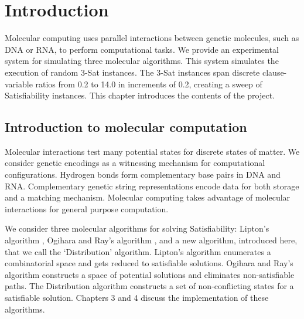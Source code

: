 \chapter{Introduction}


Molecular computing uses parallel interactions between genetic molecules, such as DNA or RNA, to perform computational tasks.  We provide an experimental system for simulating three molecular algorithms.  This system simulates the execution of random $3$-{\sc Sat} instances.  The $3$-{\sc Sat} instances span discrete clause-variable ratios from 0.2 to 14.0 in increments of 0.2, creating a sweep of {\sc Satisfiability} instances.  This chapter introduces the contents of the project.

\section{Introduction to molecular computation}
	
				
Molecular interactions test many potential states for discrete states of matter.  We consider genetic encodings as a witnessing mechanism for computational configurations.  Hydrogen bonds form complementary base pairs in DNA and RNA.  Complementary genetic string representations encode data for both storage and a matching mechanism.  Molecular computing takes advantage of molecular interactions for general purpose computation.

	We consider three molecular algorithms for solving {\sc Satisfiability}: Lipton's algorithm \cite{Lipton95usingdna}, Ogihara and Ray's algorithm \cite{Ogihara:1996:BFS:898228, Ogihara97dna-basedparallel}, and a new algorithm, introduced here, that we call the `Distribution' algorithm.  Lipton's algorithm enumerates a combinatorial space and gets reduced to satisfiable solutions.  Ogihara and Ray's algorithm constructs a space of potential solutions and eliminates non-satisfiable paths.  The Distribution algorithm constructs a set of non-conflicting states for a satisfiable solution.  Chapters 3 and 4 discuss the implementation of these algorithms.
				
